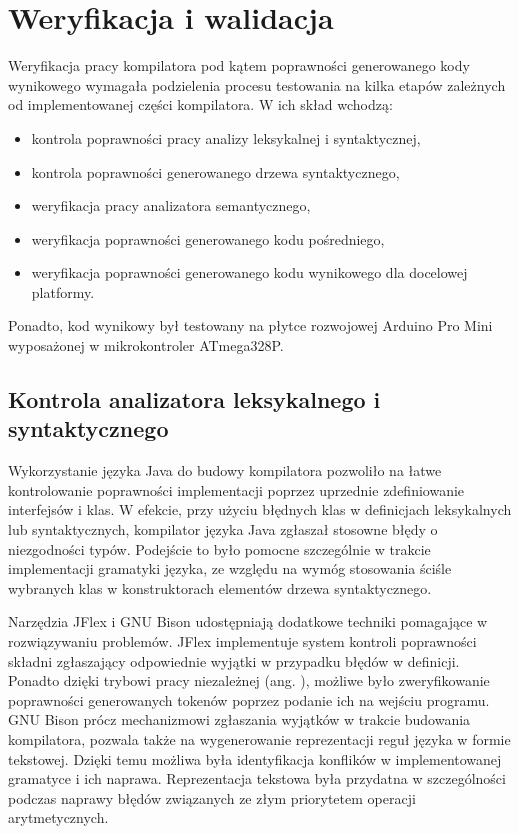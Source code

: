 \chapter{Weryfikacja i walidacja}
\label{ch:06}
Weryfikacja pracy kompilatora pod kątem poprawności generowanego kody wynikowego wymagała podzielenia procesu testowania na kilka etapów zależnych od implementowanej części kompilatora. W ich skład wchodzą:
\begin{itemize}
\item kontrola poprawności pracy analizy leksykalnej i syntaktycznej,
\item kontrola poprawności generowanego drzewa syntaktycznego,
\item weryfikacja pracy analizatora semantycznego,
\item weryfikacja poprawności generowanego kodu pośredniego,
\item weryfikacja poprawności generowanego kodu wynikowego dla docelowej platformy.
\end{itemize}
Ponadto, kod wynikowy był testowany na płytce rozwojowej Arduino Pro Mini wyposażonej w mikrokontroler ATmega328P.
\section{Kontrola analizatora leksykalnego i syntaktycznego}
Wykorzystanie języka Java do budowy kompilatora pozwoliło na łatwe kontrolowanie poprawności implementacji poprzez uprzednie zdefiniowanie interfejsów i klas. W efekcie, przy użyciu błędnych klas w definicjach leksykalnych lub syntaktycznych, kompilator języka Java zgłaszał stosowne błędy o niezgodności typów. Podejście to było pomocne szczególnie w trakcie implementacji gramatyki języka, ze względu na wymóg stosowania ściśle wybranych klas w konstruktorach elementów drzewa syntaktycznego.

Narzędzia JFlex i GNU Bison udostępniają dodatkowe techniki pomagające w rozwiązywaniu problemów. JFlex implementuje system kontroli poprawności składni zgłaszający odpowiednie wyjątki w przypadku błędów w definicji. Ponadto dzięki trybowi pracy niezależnej (ang. ), możliwe było zweryfikowanie poprawności generowanych tokenów poprzez podanie ich na wejściu programu.
GNU Bison prócz mechanizmowi zgłaszania wyjątków w trakcie budowania kompilatora, pozwala także na wygenerowanie reprezentacji reguł języka w formie tekstowej. Dzięki temu możliwa była identyfikacja konflików w implementowanej gramatyce i ich naprawa. Reprezentacja tekstowa była przydatna w szczególności podczas naprawy błędów związanych ze złym priorytetem operacji arytmetycznych.

